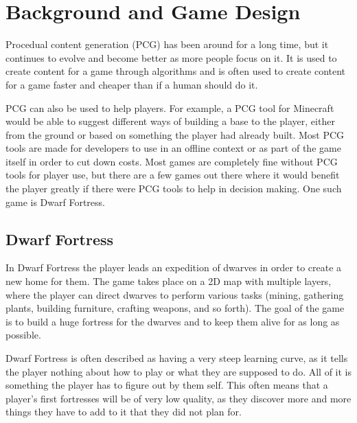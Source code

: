 \section{Background and Game Design}
\label{02}

Procedual content generation (PCG) has been around for a long time, but it continues to evolve and become better as more people focus on it. It is used to create content for a game through algorithms and is often used to create content for a game faster and cheaper than if a human should do it.

PCG can also be used to help players. For example, a PCG tool for Minecraft would be able to suggest different ways of building a base to the player, either from the ground or based on something the player had already built. Most PCG tools are made for developers to use in an offline context or as part of the game itself in order to cut down costs. Most games are completely fine without PCG tools for player use, but there are a few games out there where it would benefit the player greatly if there were PCG tools to help in decision making. One such game is Dwarf Fortress.

\subsection{Dwarf Fortress}
\label{02_DF}

In Dwarf Fortress the player leads an expedition of dwarves in order to create a new home for them. The game takes place on a 2D map with multiple layers, where the player can direct dwarves to perform various tasks (mining, gathering plants, building furniture, crafting weapons, and so forth). The goal of the game is to build a huge fortress for the dwarves and to keep them alive for as long as possible.

Dwarf Fortress is often described as having a very steep learning curve, as it tells the player nothing about how to play or what they are supposed to do. All of it is something the player has to figure out by them self. This often means that a player's first fortresses will be of very low quality, as they discover more and more things they have to add to it that they did not plan for.




